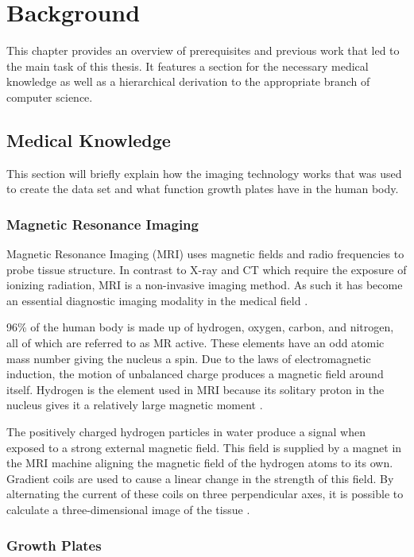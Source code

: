 \section{Background}

This chapter provides an overview of prerequisites and previous work that led to the main task of this thesis. It features a section for the necessary medical knowledge as well as a hierarchical derivation to the appropriate branch of computer science.

\subsection{Medical Knowledge}

This section will briefly explain how the imaging technology works that was used to create the data set and what function growth plates have in the human body.

\subsubsection{Magnetic Resonance Imaging}

Magnetic Resonance Imaging (MRI) uses magnetic fields and radio frequencies to probe tissue structure. In contrast to X-ray and CT which require the exposure of ionizing radiation, MRI is a non-invasive imaging method. As such it has become an essential diagnostic imaging modality in the medical field \cite{Westbrook2016}.

96\% of the human body is made up of hydrogen, oxygen, carbon, and nitrogen, all of which are referred to as MR active. These elements have an odd atomic mass number giving the nucleus a spin. Due to the laws of electromagnetic induction, the motion of unbalanced charge produces a magnetic field around itself. Hydrogen is the element used in MRI because its solitary proton in the nucleus gives it a relatively large magnetic moment \cite{Westbrook2016}. 

The positively charged hydrogen particles in water produce a signal when exposed to a strong external magnetic field. This field is supplied by a magnet in the MRI machine aligning the magnetic field of the hydrogen atoms to its own. Gradient coils are used to cause a linear change in the strength of this field. By alternating the current of these coils on three perpendicular axes, it is possible to calculate a three-dimensional image of the tissue \cite{Westbrook2016}.

\subsubsection{Growth Plates}

